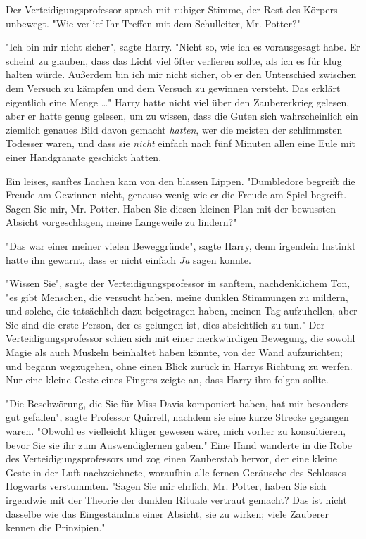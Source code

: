 {Der Verteidigungsprofessor sprach mit ruhiger Stimme, der Rest des Körpers unbewegt. "Wie verlief Ihr Treffen mit dem Schulleiter, Mr. Potter?"

"Ich bin mir nicht sicher", sagte Harry. "Nicht so, wie ich es vorausgesagt habe. Er scheint zu glauben, dass das Licht viel öfter verlieren sollte, als ich es für klug halten würde. Außerdem bin ich mir nicht sicher, ob er den Unterschied zwischen dem Versuch zu kämpfen und dem Versuch zu gewinnen versteht. Das erklärt eigentlich eine Menge …" Harry hatte nicht viel über den Zaubererkrieg gelesen, aber er hatte genug gelesen, um zu wissen, dass die Guten sich wahrscheinlich ein ziemlich genaues Bild davon gemacht \emph{hatten}, wer die meisten der schlimmsten Todesser waren, und dass sie \emph{nicht} einfach nach fünf Minuten allen eine Eule mit einer Handgranate geschickt hatten.

Ein leises, sanftes Lachen kam von den blassen Lippen. "Dumbledore begreift die Freude am Gewinnen nicht, genauso wenig wie er die Freude am Spiel begreift. Sagen Sie mir, Mr. Potter. Haben Sie diesen kleinen Plan mit der bewussten Absicht vorgeschlagen, meine Langeweile zu lindern?"

"Das war einer meiner vielen Beweggründe", sagte Harry, denn irgendein Instinkt hatte ihn gewarnt, dass er nicht einfach \emph{Ja} sagen konnte.

"Wissen Sie", sagte der Verteidigungsprofessor in sanftem, nachdenklichem Ton, "es gibt Menschen, die versucht haben, meine dunklen Stimmungen zu mildern, und solche, die tatsächlich dazu beigetragen haben, meinen Tag aufzuhellen, aber Sie sind die erste Person, der es gelungen ist, dies absichtlich zu tun." Der Verteidigungsprofessor schien sich mit einer merkwürdigen Bewegung, die sowohl Magie als auch Muskeln beinhaltet haben könnte, von der Wand aufzurichten; und begann wegzugehen, ohne einen Blick zurück in Harrys Richtung zu werfen. Nur eine kleine Geste eines Fingers zeigte an, dass Harry ihm folgen sollte.

"Die Beschwörung, die Sie für Miss Davis komponiert haben, hat mir besonders gut gefallen", sagte Professor Quirrell, nachdem sie eine kurze Strecke gegangen waren. "Obwohl es vielleicht klüger gewesen wäre, mich vorher zu konsultieren, bevor Sie sie ihr zum Auswendiglernen gaben." Eine Hand wanderte in die Robe des Verteidigungsprofessors und zog einen Zauberstab hervor, der eine kleine Geste in der Luft nachzeichnete, woraufhin alle fernen Geräusche des Schlosses Hogwarts verstummten. "Sagen Sie mir ehrlich, Mr. Potter, haben Sie sich irgendwie mit der Theorie der dunklen Rituale vertraut gemacht? Das ist nicht dasselbe wie das Eingeständnis einer Absicht, sie zu wirken; viele Zauberer kennen die Prinzipien."

}
